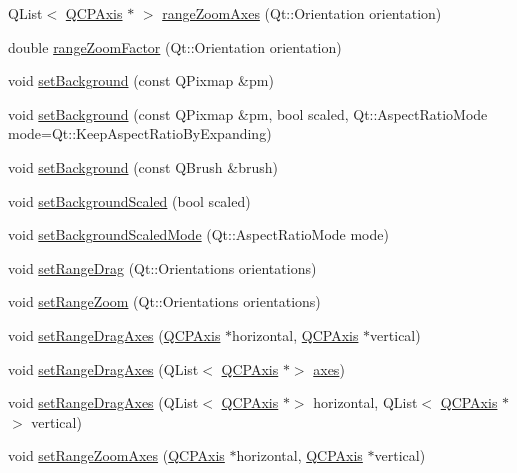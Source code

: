 \begin{DoxyCompactItemize}
\item 
Q\+List$<$ \hyperlink{class_q_c_p_axis}{Q\+C\+P\+Axis} $\ast$ $>$ \hyperlink{class_q_c_p_axis_rect_a86aac0f435f209d60dacd22cda10c104}{range\+Zoom\+Axes} (Qt\+::\+Orientation orientation)
\item 
double \hyperlink{class_q_c_p_axis_rect_ae4e6c4d143aacc88d2d3c56f117c2fe1}{range\+Zoom\+Factor} (Qt\+::\+Orientation orientation)
\item 
void \hyperlink{class_q_c_p_axis_rect_af615ab5e52b8e0a9a0eff415b6559db5}{set\+Background} (const Q\+Pixmap \&pm)
\item 
void \hyperlink{class_q_c_p_axis_rect_ac48a2d5d9b7732e73b86605c69c5e4c1}{set\+Background} (const Q\+Pixmap \&pm, bool scaled, Qt\+::\+Aspect\+Ratio\+Mode mode=Qt\+::\+Keep\+Aspect\+Ratio\+By\+Expanding)
\item 
void \hyperlink{class_q_c_p_axis_rect_a22a22b8668735438dc06f9a55fe46b33}{set\+Background} (const Q\+Brush \&brush)
\item 
void \hyperlink{class_q_c_p_axis_rect_ae6d36c3e0e968ffb991170a018e7b503}{set\+Background\+Scaled} (bool scaled)
\item 
void \hyperlink{class_q_c_p_axis_rect_a5ef77ea829c9de7ba248e473f48f7305}{set\+Background\+Scaled\+Mode} (Qt\+::\+Aspect\+Ratio\+Mode mode)
\item 
void \hyperlink{class_q_c_p_axis_rect_ae6aef2f7211ba6097c925dcd26008418}{set\+Range\+Drag} (Qt\+::\+Orientations orientations)
\item 
void \hyperlink{class_q_c_p_axis_rect_a7960a9d222f1c31d558b064b60f86a31}{set\+Range\+Zoom} (Qt\+::\+Orientations orientations)
\item 
void \hyperlink{class_q_c_p_axis_rect_a648cce336bd99daac4a5ca3e5743775d}{set\+Range\+Drag\+Axes} (\hyperlink{class_q_c_p_axis}{Q\+C\+P\+Axis} $\ast$horizontal, \hyperlink{class_q_c_p_axis}{Q\+C\+P\+Axis} $\ast$vertical)
\item 
void \hyperlink{class_q_c_p_axis_rect_ab756bc5f129115fa3e8783617292fc1a}{set\+Range\+Drag\+Axes} (Q\+List$<$ \hyperlink{class_q_c_p_axis}{Q\+C\+P\+Axis} $\ast$$>$ \hyperlink{class_q_c_p_axis_rect_a8db4722cb93e9c4a6f0d91150c200867}{axes})
\item 
void \hyperlink{class_q_c_p_axis_rect_ab767e659f952fd7cbf61faaf33feefc5}{set\+Range\+Drag\+Axes} (Q\+List$<$ \hyperlink{class_q_c_p_axis}{Q\+C\+P\+Axis} $\ast$$>$ horizontal, Q\+List$<$ \hyperlink{class_q_c_p_axis}{Q\+C\+P\+Axis} $\ast$$>$ vertical)
\item 
void \hyperlink{class_q_c_p_axis_rect_a9442cca2aa358405f39a64d51eca13d2}{set\+Range\+Zoom\+Axes} (\hyperlink{class_q_c_p_axis}{Q\+C\+P\+Axis} $\ast$horizontal, \hyperlink{class_q_c_p_axis}{Q\+C\+P\+Axis} $\ast$vertical)
$$
\end{DoxyCompactItemize}
